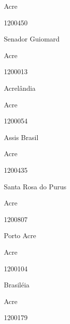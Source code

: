 \documentclass[
  letterpaper,
]{report}
\begin{document}
\n    

\n      

Acre

\n      

1200450

\n      

Senador Guiomard

\n    

\n    

\n      

Acre

\n      

1200013

\n      

Acrelândia

\n    

\n    

\n      

Acre

\n      

1200054

\n      

Assis Brasil

\n    

\n    

\n      

Acre

\n      

1200435

\n      

Santa Rosa do Purus

\n    

\n    

\n      

Acre

\n      

1200807

\n      

Porto Acre

\n    

\n    

\n      

Acre

\n      

1200104

\n      

Brasiléia

\n    

\n    

\n      

Acre

\n      

1200179
\end{document}
